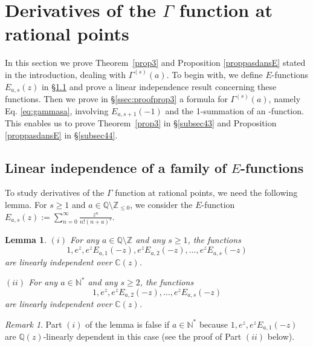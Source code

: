 \documentclass[reqno,12pt]{article}
\numberwithin{equation}{section}
\newtheorem{lem}{Lemma}
\theoremstyle{remark}
\newtheorem{Remark}{Remark}
\newcommand{\tantie}{{\fontencoding{OT2}\fontfamily{wncyr}\selectfont\CYREREV}}
\newcommand{\antie}{\text{\tantie}}
\begin{document}
\section{Derivatives of the $\Gamma $ function at rational points} \label{sec:consequences}

In this section we prove Theorem~\ref{prop3} and Proposition \ref{proppasdansE} stated in the introduction, dealing with $\Gamma^{(s)}(a)$. To begin with, we define $E$-functions $E_{a,s}(z)$ in \S \ref{ssec:conseq1} and prove a linear independence result concerning these functions. Then we prove in \S \ref{ssec:proofprop3} a formula for $\Gamma^{(s)}(a)$, namely Eq. \eqref{eq:gammasa}, involving $E_{a,s+1}(-1)$ and the 1-summation of an \antie-function. This enables us to prove Theorem~\ref{prop3} in \S \ref{subsec43} and Proposition \ref{proppasdansE} in \S \ref{subsec44}.

\subsection{Linear independence of a family of $E$-functions}\label{ssec:conseq1}

To study derivatives of the $\Gamma $ function at rational points, we need the following lemma. For $s\ge 1$ and  $a\in \mathbb Q\setminus \mathbb Z_{\leq 0}$, we consider the $E$-function $E_{a,s}(z):=\sum_{n=0}^\infty \frac{z^n}{n!(n+a)^s}$. 
\begin{lem}\label{lemmenew} 
$(i)$ For any $a\in \mathbb Q\setminus \mathbb Z$ and any $s\ge 1$,  the functions 
$$
1, e^z, e^zE_{a,1}(-z), e^zE_{a,2}(-z), \ldots, e^zE_{a,s}(-z)
$$ 
are linearly independent over $\mathbb C(z)$. 

\medskip

\noindent $(ii)$ For any $a\in \mathbb N^*$ and any $s\ge 2$,  the functions 
$$
1, e^z, e^zE_{a,2}(-z), \ldots, e^zE_{a,s}(-z)
$$ 
are linearly independent over $\mathbb C(z)$. 
\end{lem}
\begin{Remark} Part $(i)$ of the lemma is false if $a\in \mathbb N^{*}$ because $1, e^z, e^zE_{a,1}(-z)$ are $\mathbb Q(z)$-linearly dependent in this case (see the proof of Part $(ii)$ below).
\end{Remark}
\end{document}
